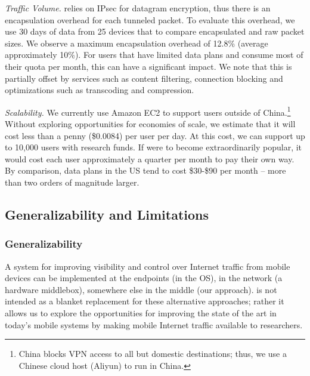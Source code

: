 \noindent\emph{Traffic Volume.}
\meddle relies on IPsec for datagram encryption, thus there is an encapsulation overhead for each tunneled packet. 
To evaluate this overhead, we use 30 days of data from 25 devices that to compare encapsulated and raw packet sizes. 
We observe a maximum encapsulation overhead of 12.8\% (average approximately 10\%). 
For users that have limited data plans and consume most of their quota per month, this can have 
a significant impact. We note that this is partially offset by \meddle services such as content filtering, 
connection blocking and optimizations such as transcoding and compression. 

\noindent\emph{Scalability.} We currently use Amazon EC2 to support users outside of China.\footnote{China 
blocks VPN access to all but domestic destinations; thus, we use a Chinese cloud host (Aliyun) to run  
\meddle in China.} Without exploring opportunities for economies of scale, we estimate that 
it will cost less than a penny (\$0.0084) per user per day. At this cost, we can support up to 
10,000 users with research funds. If \meddle were to become extraordinarily popular, it would 
cost each user approximately a quarter per month to pay their own way. By comparison, 
data plans in the US tend to cost \$30-\$90 per month -- more than two orders of magnitude larger.


\subsection{Generalizability and Limitations}

\subsubsection{Generalizability} A system for improving visibility and control over Internet traffic from mobile 
devices can be implemented at the endpoints (\eg in the OS), in the network (\eg a hardware middlebox), 
somewhere else in the middle (our approach). \meddle is not intended as a blanket replacement for 
these alternative approaches; rather it allows us to explore the opportunities for improving the state of the 
art in today's mobile systems by making mobile Internet traffic available to researchers. 

